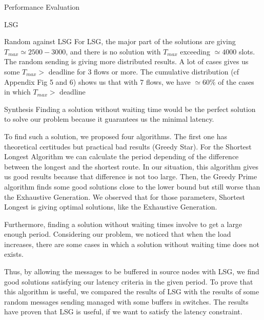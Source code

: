 \documentclass[a4paper,10pt]{report}
\begin{document}
\begin{chapter}{Performance Evaluation}
\begin{section}{LSG}
\begin{subsection}{Random against LSG}
For LSG, the major part of the solutions are giving $T_{max} \simeq 2500-3000$, and there is no
solution with $T_{max}$ exceeding $\simeq 4000$ slots.
The random sending is giving more distributed results. A lot of cases gives us some $T_{max} >$ deadline for 3 flows or more.
The cumulative distribution (cf Appendix Fig 5 and 6) shows us that with 7 flows, we have $\simeq 60\%$ of the cases in which $T_{max} >$ deadline


\end{subsection}

\end{section}

\begin{section}{Synthesis}
Finding a solution without waiting time would be the perfect solution to solve our problem because it guarantees us the minimal latency.

To find such a solution, we proposed four algorithms. The first one has theoretical certitudes but practical bad results (Greedy Star).
For the Shortest Longest Algorithm we can calculate the period depending of the difference between the longest and the shortest route.
In our situation, this algorithm gives us good results because that difference is not too large.
Then, the Greedy Prime algorithm finds some good solutions close to the lower bound but still worse than the Exhaustive Generation.
We observed that for those parameters, Shortest Longest is giving optimal solutions, like the Exhaustive Generation.

Furthermore, finding a solution without waiting times involve to get a large enough period. Considering our problem, we noticed that when the 
load increases, there are some cases in which a solution without waiting time does not exists.

Thus, by allowing the messages to be buffered in source nodes with LSG, we find good solutions satisfying our latency 
criteria in the given period. To prove that this algorithm is useful, we compared the results of LSG with the results of some
random messages sending managed with some buffers in switches. The results have proven that LSG is useful, if we want
to satisfy the latency constraint.

\end{section}

\end{chapter}
\end{document}
